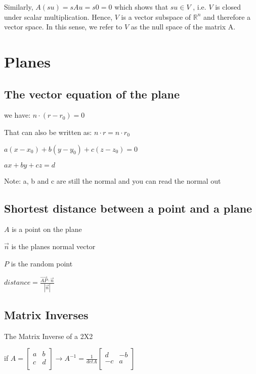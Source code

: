 \documentclass{extarticle}
\begin{document}
\begin{multicols}{2}
\begin{tcolorbox}[enhanced jigsaw,sharp corners,coltext=black,colback=BurntOrange!25!white,boxrule=0pt,breakable,size=minimal]
Similarly, $A(su) = sAu = s0 = 0$ which shows that $su \in V$ , i.e. $V$ is closed under scalar multiplication.
Hence, $V$ is a vector subspace of ${\mathbb{R}}^n$ and therefore a vector space. In this sense, we refer to $V$ as the null space of the matrix A.
\end{tcolorbox}


\section{Planes}
\subsection{The vector equation of the plane}
we have: $n\cdot\left(r-r_0\right)=0$

That can also be written as: $n\cdot r=n\cdot r_0$

$a\left(x-x_0\right)+b\left(y-y_0\right)+c\left(z-z_0\right)=0$

$ax+by+cz=d$

Note: a, b and c are still the normal and you can read the normal out


\begin{tcolorbox}[enhanced jigsaw,sharp corners,coltext=black,colback=Red!25!white,boxrule=0pt,breakable,size=minimal]
\subsection{Shortest distance between a point and a plane}
$A$ is a point on the plane

$\vec{n}$ is the planes normal vector

$P$ is the random point

$distance=\frac{\vec{AP}\cdot\vec{n}}{\left|\vec{n}\right|}$



\end{tcolorbox}







\subsection{Matrix Inverses}
The Matrix Inverse of a 2X2

if $A=\left[\begin{matrix}a&b\\c&d\\\end{matrix}\right]\rightarrow A^{-1}=\frac{1}{detA}\left[\begin{matrix}d&-b\\-c&a\\\end{matrix}\right]$


\end{multicols}
\end{document}
